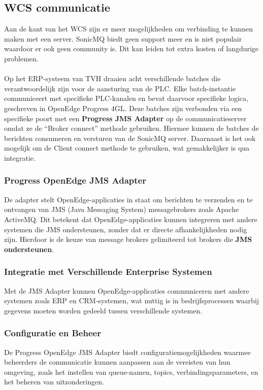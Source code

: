 \subsection{WCS communicatie} 
Aan de kant van het WCS zijn er meer mogelijkheden om verbinding te kunnen maken met een server.
SonicMQ biedt geen support meer en is niet populair waardoor er ook geen community is.
Dit kan leiden tot extra kosten of langdurige problemen.
\\\\
Op het ERP-systeem van TVH draaien acht verschillende batches die verantwoordelijk zijn voor de aansturing van de PLC. 
Elke batch-instantie communiceert met specifieke PLC-kanalen en bevat daarvoor specifieke logica, geschreven in OpenEdge Progress 4GL.
Deze batches zijn verbonden via een specifieke poort met een \textbf{Progress JMS Adapter} op de communicatieserver omdat ze de ``Broker connect'' methode gebruiken.
Hiermee kunnen de batches de berichten consumeren en versturen van de SonicMQ server.
Daarnaast is het ook mogelijk om de Client connect methode te gebruiken, wat gemakkelijker is qua integratie.

\subsubsection{Progress OpenEdge JMS Adapter}
De adapter stelt OpenEdge-applicaties in staat om berichten te verzenden en te ontvangen van JMS (Java Messaging System)
messagebrokers zoals Apache ActiveMQ. 
Dit betekent dat OpenEdge-applicaties kunnen integreren met andere systemen die JMS ondersteunen, 
zonder dat er directe afhankelijkheden nodig zijn.
Hierdoor is de keuze van message brokers gelimiteerd tot brokers die \textbf{JMS ondersteunen}.

\subsubsection{Integratie met Verschillende Enterprise Systemen}
Met de JMS Adapter kunnen OpenEdge-applicaties communiceren met andere systemen zoals ERP en CRM-systemen, 
wat nuttig is in bedrijfsprocessen waarbij gegevens moeten worden gedeeld tussen verschillende systemen.

\subsubsection{Configuratie en Beheer}
De Progress OpenEdge JMS Adapter biedt configuratiemogelijkheden waarmee beheerders de communicatie kunnen aanpassen 
aan de vereisten van hun omgeving, zoals het instellen van queue-namen, topics, verbindingsparameters, en het beheren van uitzonderingen.

